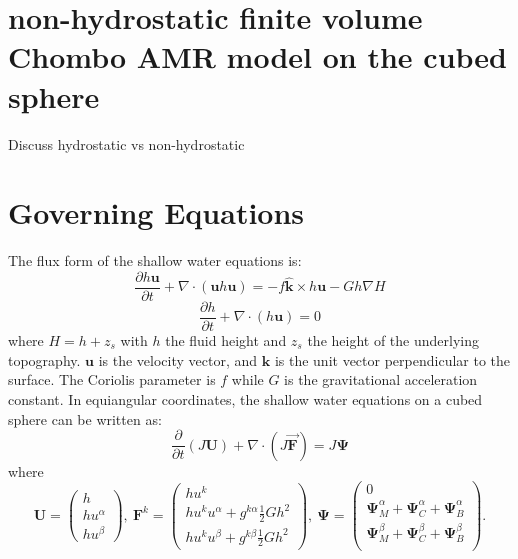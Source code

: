 \section{non-hydrostatic finite volume Chombo AMR model on the cubed sphere}
Discuss hydrostatic vs non-hydrostatic

\section{Governing Equations}

The flux form of the shallow water equations is:
\begin{equation}
	\frac{\partial h\mathbf{u}}{\partial t}+\nabla\cdot(\mathbf{u}h\mathbf{u})=-f\mathbf{\hat{k}}\times h\mathbf{u}-Gh\nabla H
\end{equation}
\begin{equation}
	\frac{\partial h}{\partial t}+\nabla\cdot(h\mathbf{u})=0
\end{equation}
where $H=h+z_{s}$ with $h$ the fluid height and $z_{s}$ the height of the underlying topography. $\mathbf{u}$ is the velocity vector, and $\mathbf{\hat{k}}$ is the unit vector perpendicular to the surface.  The Coriolis parameter is $f$ while $G$ is the gravitational acceleration constant. In equiangular coordinates, the shallow water equations on a cubed sphere can be written as:
\begin{equation}
     \label{eq:SWcubesphere}
     \frac{\partial}{\partial t}\left(J\mathbf{U}\right) + \nabla\cdot(J\mathbf{\vec{F}}) = J\mathbf{\Psi}
\end{equation}
where
\begin{equation}
      \mathbf{U}= \left( \begin{array}{c}
       h \\
       h u^\alpha \\
       h u^\beta
       \end{array} \right), \
       \mathbf{F}^k = \left( \begin{array}{c}
        h u^k \\
        hu^{k}u^{\alpha}+g^{k \alpha}\frac{1}{2}Gh^{2} \\
        hu^{k}u^{\beta}+g^{k \beta}\frac{1}{2}Gh^{2} 
        \end{array} \right), \
        \mathbf{\Psi} =  \left( \begin{array}{c}
        0 \\
        \mathbf{\Psi}_{M}^{\alpha}+\mathbf{\Psi}_{C}^{\alpha}+\mathbf{\Psi}_{B}^{\alpha} \\
        \mathbf{\Psi}_{M}^{\beta}+\mathbf{\Psi}_{C}^{\beta}+\mathbf{\Psi}_{B}^{\beta} \\
         \end{array} \right).
\end{equation}

